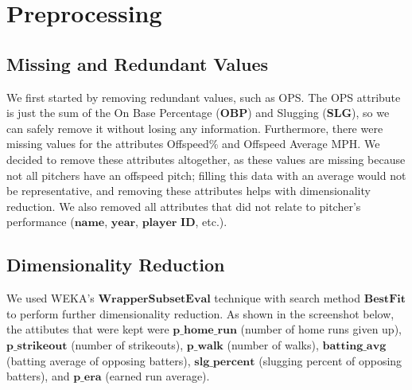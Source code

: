 \documentclass[12pt]{article}
\begin{document}
\section{Preprocessing}
\subsection{Missing and Redundant Values}
We first started by removing redundant values, such as OPS. The OPS attribute is just the sum of the On Base Percentage ($\textbf{OBP}$) and Slugging ($\textbf{SLG}$), so we can safely remove it without losing any information. Furthermore, there were missing values for the attributes Offspeed\% and Offspeed Average MPH. We decided to remove these attributes altogether, as these values are missing because not all pitchers have an offspeed pitch; filling this data with an average would not be representative, and removing these attributes helps with dimensionality reduction. We also removed all attributes that did not relate to pitcher's performance ($\textbf{name}$, $\textbf{year}$, $\textbf{player}$ $\textbf{ID}$, etc.). 
\newpage{}
\subsection{Dimensionality Reduction}
We used WEKA's $\textbf{WrapperSubsetEval}$ technique with search method $\textbf{BestFit}$ to perform further dimensionality reduction. As shown in the screenshot below, the attibutes that were kept were $\textbf{p\_home\_run}$ (number of home runs given up), $\textbf{p\_strikeout}$ (number of strikeouts), $\textbf{p\_walk}$ (number of walks), $\textbf{batting\_avg}$ (batting average of opposing batters), $\textbf{slg\_percent}$ (slugging percent of opposing batters), and $\textbf{p\_era}$ (earned run average). 
\end{document}
